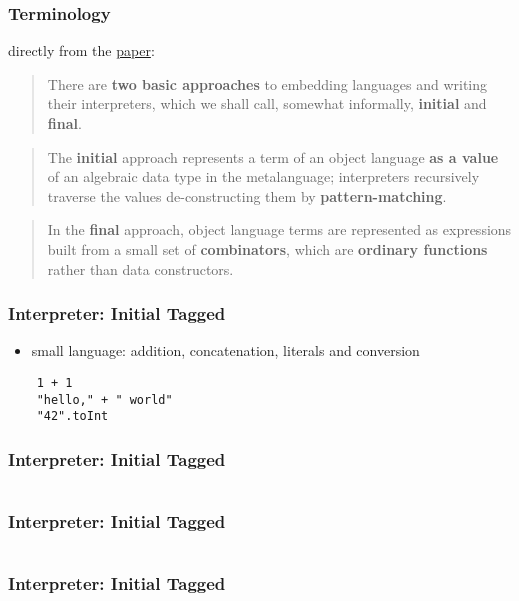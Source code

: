 \documentclass[aspectratio=169, hyperref={colorlinks, linkcolor=beamer@centricgreen}, urlcolor=links]{beamer}
\begin{document}
\begin{frame}
  \frametitle{Terminology}

  directly from the \href{http://okmij.org/ftp/tagless-final/course/lecture.pdf}{paper}:
  \vfill
  \begin{quote}
    There are \textbf{two basic approaches} to embedding languages and
    writing their interpreters, which we shall call, somewhat
    informally, \textbf{initial} and \textbf{final}.
  \end{quote}
  \vfill
  \begin{quote}
    The \textbf{initial} approach represents a term of an object
    language \textbf{as a value} of an algebraic data type in the
    metalanguage; interpreters recursively traverse the values
    de-constructing them by \textbf{pattern-matching}.
  \end{quote}
  \vfill
  \begin{quote}
    In the \textbf{final} approach, object language terms are
    represented as expressions built from a small set of
    \textbf{combinators}, which are \textbf{ordinary functions} rather
    than data constructors.
  \end{quote}
\end{frame}

\begin{frame}[fragile]
  \frametitle{Interpreter: Initial Tagged}
  \begin{itemize}
  \item small language: addition, concatenation, literals and conversion
  \end{itemize}
  \begin{verbatim}
    1 + 1
    "hello," + " world"
    "42".toInt
  \end{verbatim}
\end{frame}

\begin{frame}[fragile]
  \frametitle{Interpreter: Initial Tagged}
  \inputminted[fontsize=\footnotesize]{scala}{snippets/initial-tagged-expr.scala}
\end{frame}

\begin{frame}[fragile]
  \frametitle{Interpreter: Initial Tagged}
  \inputminted[fontsize=\footnotesize]{scala}{snippets/initial-tagged-sample.scala}
\end{frame}

\begin{frame}[fragile]
  \frametitle{Interpreter: Initial Tagged}
  \inputminted[fontsize=\footnotesize]{scala}{snippets/initial-tagged-interp.scala}
\end{frame}
\end{document}
